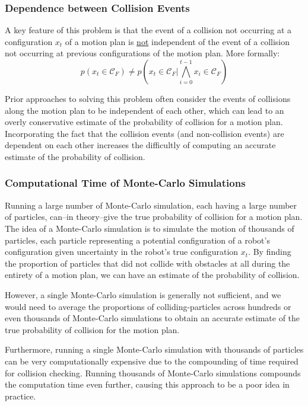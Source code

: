 \documentclass[journal]{IEEEtran}
\begin{document}
\subsubsection{Dependence between Collision Events}
A key feature of this problem is that the event of a collision not occurring at a configuration $x_t$ of a motion plan is \underline{not} independent of the event of a collision not occurring at previous configurations of the motion plan. More formally:
$$p(x_t \in \mathcal{C}_F) \neq p\left(x_t \in \mathcal{C}_F | \bigwedge\limits_{i=0}^{t-1} x_i \in \mathcal{C}_F \right)$$

Prior approaches to solving this problem often consider the events of collisions along the motion plan to be independent of each other, which can lead to an overly conservative estimate of the probability of collision for a motion plan. Incorporating the fact that the collision events (and non-collision events) are dependent on each other increases the difficultly of computing an accurate estimate of the probability of collision.

\subsubsection{Computational Time of Monte-Carlo Simulations}

Running a large number of Monte-Carlo simulation, each having a large number of particles, can--in theory--give the true probability of collision for a motion plan. The idea of a Monte-Carlo simulation is to simulate the motion of thousands of particles, each particle representing a potential configuration of a robot's configuration given uncertainty in the robot's true configuration $x_t$. By finding the proportion of particles that did not collide with obstacles at all during the entirety of a motion plan, we can have an estimate of the probability of collision.

However, a single Monte-Carlo simulation is generally not sufficient, and we would need to average the proportions of colliding-particles across hundreds or even thousands of Monte-Carlo simulations to obtain an accurate estimate of the true probability of collision for the motion plan.

Furthermore, running a single Monte-Carlo simulation with thousands of particles can be very computationally expensive due to the compounding of time required for collision checking. Running thousands of Monte-Carlo simulations compounds the computation time even further, causing this approach to be a poor idea in practice.%
\end{document}
